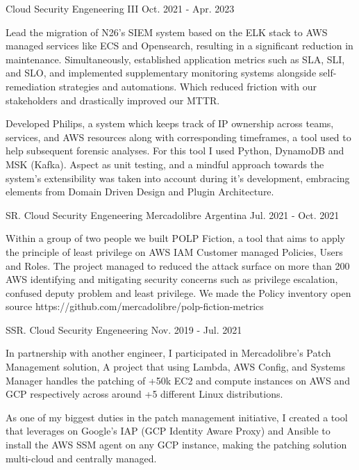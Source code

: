 \begin{cventries}
	\cventry
	{Cloud Security Engeneering III} %
	{} %
	{} %
	{Oct. 2021 - Apr. 2023} %
	{
		\begin{cvitems} %
			\item {Lead the migration of N26's SIEM system based on the ELK stack to AWS managed services like ECS and Opensearch, resulting in a significant reduction in maintenance. Simultaneously, established application metrics such as SLA, SLI, and SLO, and implemented supplementary monitoring systems alongside self-remediation strategies and automations. Which reduced friction with our stakeholders and drastically improved our MTTR.}
			\item {Developed Philips, a system which keeps track of IP ownership across teams, services, and AWS resources along with corresponding timeframes, a tool used to help subsequent forensic analyses. For this tool I used Python, DynamoDB and MSK (Kafka). Aspect as unit testing, and a mindful approach towards the system's extensibility was taken into account during it's development, embracing elements from Domain Driven Design and Plugin Architecture.}
		\end{cvitems}
	}
	\cventry
	{SR. Cloud Security Engeneering} %
	{Mercadolibre} %
	{Argentina} %
	{Jul. 2021 - Oct. 2021} %
	{
		\begin{cvitems} %
			\item {Within a group of two people we built POLP Fiction, a tool that aims to apply the principle of least privilege on AWS IAM Customer managed Policies, Users and Roles. The project managed to reduced the attack surface on more than 200 AWS identifying and mitigating security concerns such as privilege escalation, confused deputy problem and least privilege. We made the Policy inventory open source https://github.com/mercadolibre/polp-fiction-metrics}
		\end{cvitems}
	}
	\cventry
	{SSR. Cloud Security Engeneering} %
	{} %
	{} %
	{Nov. 2019 - Jul. 2021} %
	{
		\begin{cvitems} %
			\item {In partnership with another engineer, I participated in Mercadolibre's Patch Management solution, A project that using Lambda, AWS Config, and Systems Manager handles the patching of +50k EC2 and compute instances on AWS and GCP respectively across around +5 different Linux distributions.}
			\item {As one of my biggest duties in the patch management initiative, I created a tool that leverages on Google's IAP (GCP Identity Aware Proxy) and Ansible to install the AWS SSM agent on any GCP instance, making the patching solution multi-cloud and centrally managed.}
		\end{cvitems}
	}


\end{cventries}
